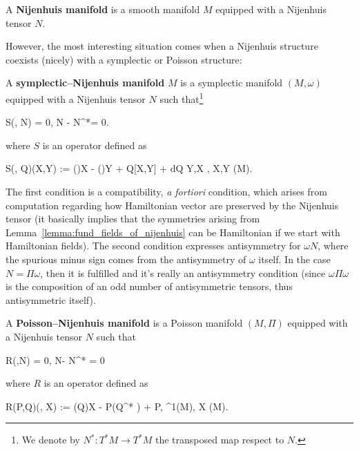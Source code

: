 \documentclass[main.tex]{subfiles}
\begin{document}
\begin{definition}
	A \textbf{Nijenhuis manifold} is a smooth manifold $M$ equipped with a Nijenhuis tensor $N$.
\end{definition}

However, the most interesting situation comes when a Nijenhuis structure coexists (nicely) with a symplectic or Poisson structure:

\begin{definition}
	A \textbf{symplectic--Nijenhuis manifold} $M$ is a symplectic manifold $(M, \omega)$ equipped with a Nijenhuis tensor $N$ such that\footnote{We denote by $N^* : T^*M \to T^*M$ the transposed map respect to $N$.}
	\begin{eqalign}
	\label{eq:symp_nijenhuis_conditions}
		S(\omega, N) = 0, \quad \omega N - N^*\omega = 0.
	\end{eqalign}
	where $S$ is an operator defined as
	\begin{eqalign}
		S(\eta, Q)(X,Y) := (\eta)X - (\eta)Y + \eta Q[X,Y] + d\langle \eta Q Y,X \rangle, \quad X,Y \in \fields(M).
	\end{eqalign}
\end{definition}

The first condition is a compatibility, \emph{a fortiori} condition, which arises from computation regarding how Hamiltonian vector are preserved by the Nijenhuis tensor (it basically implies that the symmetries arising from Lemma~\ref{lemma:fund_fields_of_nijenhuis} can be Hamiltonian if we start with Hamiltonian fields). The second condition expresses antisymmetry for $\omega N$, where the spurious minus sign comes from the antisymmetry of $\omega$ itself. In the case $N=\Pi\omega$, then it is fulfilled and it's really an antisymmetry condition (since $\omega\Pi\omega$ is the composition of an odd number of antisymmetric tensors, thus antisymmetric itself).

\begin{definition}
	A \textbf{Poisson--Nijenhuis manifold} is a Poisson manifold $(M,\Pi)$ equipped with a Nijenhuis tensor $N$ such that
	\begin{eqalign}
	\label{eq:poisson_nijenhuis_conditions}
		R(\Pi,N) = 0, \quad N\Pi - \Pi N^* = 0
	\end{eqalign}
	where $R$ is an operator defined as
	\begin{eqalign}
		R(P,Q)(\alpha, X) := (Q)X - P(Q^* \alpha) + P\alpha, \quad \alpha \in \Omega^1(M), X \in \fields(M).
	\end{eqalign}
\end{definition}
\end{document}
